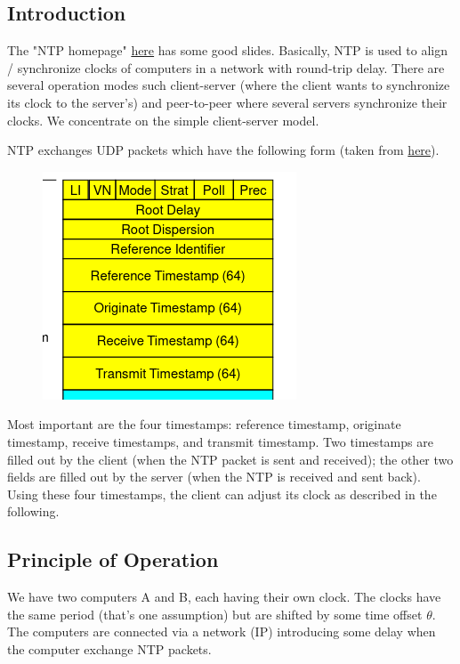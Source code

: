 
\subsection{Introduction}

The "NTP homepage" \href{https://www.eecis.udel.edu/~mills/ntp.html}{here} has some good slides. Basically, NTP is used to align / synchronize clocks of computers in a network with round-trip delay. There are several operation modes such client-server (where the client wants to synchronize its clock to the server's) and peer-to-peer where several servers synchronize their clocks. We concentrate on the simple client-server model.

NTP exchanges UDP packets which have the following form (taken from \href{https://www.eecis.udel.edu/~mills/database/brief/arch/arch.pdf}{here}).

\begin{figure}[H]
    \centering
    \includegraphics[scale=0.75]{images/ntp_1.png}
\end{figure}

Most important are the four timestamps: reference timestamp, originate timestamp, receive timestamps, and transmit timestamp. Two timestamps are filled out by the client (when the NTP packet is sent and received); the other two fields are filled out by the server (when the NTP is received and sent back). Using these four timestamps, the client can adjust its clock as described in the following.

\subsection{Principle of Operation}

We have two computers A and B, each having their own clock. The clocks have the same period (that's one assumption) but are shifted by some time offset $\theta$. The computers are connected via a network (IP) introducing some delay when the computer exchange NTP packets.

